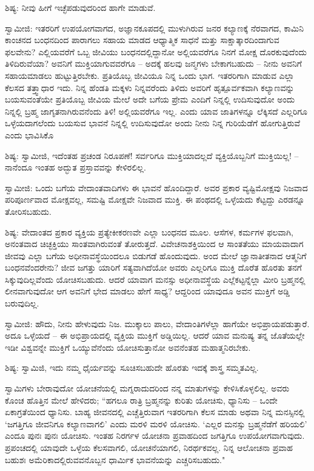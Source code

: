 ಶಿಷ್ಯ: ನೀವು ಹೀಗೆ ಇಚ್ಛೆಪಡುವುದರಿಂದ ಹಾಗೇ ಮಾಡುವೆ.

ಸ್ವಾಮೀಜಿ: ಇತರರಿಗೆ ಉಪಯೋಗವಾಗದ, ಅಜ್ಞಾನಕೂಪದಲ್ಲಿ ಮುಳುಗಿರುವ ಜನರ ಕಲ್ಯಾಣಕ್ಕೆ ನೆರವಾಗದ, ಕಾಮಿನಿ ಕಾಂಚನದ ಬಂಧನದಿಂದ ಪಾರಾಗಲು ಸಹಾಯ ಮಾಡದ ಆಧ್ಯಾತ್ಮಿಕ ಸಾಧನೆ ಮತ್ತು ಸಾಕ್ಷಾತ್ಕಾರದಿಂದಾಗುವ ಫಲವೇನು? ಎಲ್ಲಿಯವರೆಗೆ ಒಬ್ಬ ಜೀವಿಯು ಬಂಧನದಲ್ಲಿದ್ದಾನೋ ಅಲ್ಲಿಯವರೆಗೂ ನಿನಗೆ ಮೋಕ್ಷ ದೊರಕುವುದೆಂದು ತಿಳಿದಿರುವೆಯಾ? ಅವನಿಗೆ ಮುಕ್ತಿಯಾಗುವವರೆಗೂ – ಅದಕ್ಕೆ ಹಲವು ಜನ್ಮಗಳು ಬೇಕಾಗಬಹುದು – ನೀನು ಅವನಿಗೆ ಸಹಾಯಮಾಡಲು ಹುಟ್ಟುತ್ತಿರಬೇಕು. ಪ್ರತಿಯೊಬ್ಬ ಜೀವಿಯೂ ನಿನ್ನ ಒಂದು ಭಾಗ. ಇತರರಿಗಾಗಿ ಮಾಡುವ ಎಲ್ಲಾ ಕೆಲಸದ ತತ್ತ್ವಾಧಾರ ಇದು. ನಿನ್ನ ಹೆಂಡತಿ ಮಕ್ಕಳು ನಿನ್ನವರೆಂದು ತಿಳಿದು ಅವರಿಗೆ ಹೃತ್ಪೂರ್ವಕವಾಗಿ ಕಲ್ಯಾಣವನ್ನು ಬಯಸುವಂತೆಯೇ ಪ್ರತಿಯೊಬ್ಬ ಜೀವಿಯ ಮೇಲೆ ಅದೇ ಬಗೆಯ ಪ್ರೇಮ ಎಂದಿಗೆ ನಿನ್ನಲ್ಲಿ ಉದಿಸುವುದೋ ಅಂದು ನಿನ್ನಲ್ಲಿ ಬ್ರಹ್ಮ ಜಾಗೃತನಾಗಿರುವನೆಂದು ತಿಳಿ! ಅಲ್ಲಿಯವರೆಗೂ ಇಲ್ಲ. ಎಂದು ಯಾವ ಜಾತಿಗಳನ್ನೂ ಲೆಕ್ಕಿಸದೆ ಎಲ್ಲರಿಗೂ ಒಳ್ಳೆಯದಾಗಲೆಂದು ಬಯಸುವ ಭಾವನೆ ನಿನ್ನಲ್ಲಿ ಉದಿಸುವುದೋ ಅಂದು ನೀನು ನಿನ್ನ ಗುರಿಯೆಡೆಗೆ ಹೋಗುತ್ತಿರುವೆ ಎಂದು ಭಾವಿಸಿಕೊ

ಶಿಷ್ಯ: ಸ್ವಾಮೀಜಿ, ಇದೆಂತಹ ಪ್ರಚಂಡ ನಿರೂಪಣೆ! ಸರ್ವರಿಗೂ ಮುಕ್ತಿಯಾದಲ್ಲದೆ ವ್ಯಕ್ತಿಯೊಬ್ಬನಿಗೆ ಮುಕ್ತಿಯಿಲ್ಲ! – ನಾನೆಂದೂ ಇಂತಹ ಅದ್ಭುತ ಪ್ರಸ್ತಾವವನ್ನು ಕೇಳಿರಲಿಲ್ಲ.

ಸ್ವಾಮೀಜಿ: ಒಂದು ಬಗೆಯ ವೇದಾಂತವಾದಿಗಳು ಈ ಭಾವನೆ ಹೊಂದಿದ್ದಾರೆ. ಅವರ ಪ್ರಕಾರ ವ್ಯಷ್ಟಿಮೋಕ್ಷವು ನಿಜವಾದ ಪರಿಪೂರ್ಣವಾದ ಮೋಕ್ಷವಲ್ಲ, ಸಮಷ್ಟಿ ಮೋಕ್ಷವೇ ನಿಜವಾದ ಮುಕ್ತಿ. ಈ ಪಂಥದಲ್ಲಿ ಒಳ್ಳೆಯದು ಕೆಟ್ಟದ್ದು ಎರಡನ್ನೂ ತೋರಿಸಬಹುದು.

ಶಿಷ್ಯ: ವೇದಾಂತದ ಪ್ರಕಾರ ವ್ಯಕ್ತಿಯ ಪ್ರತ್ಯೇಕೀಕರಣವೇ ಎಲ್ಲಾ ಬಂಧನದ ಮೂಲ. ಆಸೆಗಳ, ಕರ್ಮಗಳ ಫಲವಾಗಿ, ಅನಂತವಾದ ಚಿಚ್ಛಕ್ತಿಯು ಸಾಂತವಾಗಿರುವಂತೆ ತೋರುತ್ತದೆ. ವಿವೇಚನಾಶಕ್ತಿಯಿಂದ ಆ ಸಾಂತತೆಯು ಮಾಯವಾದಾಗ ಜೀವವು ಎಲ್ಲಾ ಬಗೆಯ ಅಧೀನಾವಸ್ಥೆಯಿಂದಲೂ ಬಿಡುಗಡೆ ಹೊಂದುವುದು. ಅಂದ ಮೇಲೆ ಜ್ಞಾನಾತೀತನಾದ ಆತ್ಮನಿಗೆ ಬಂಧನವೆಂದರೇನು? ಜೀವ ಜಗತ್ತು ಯಾರಿಗೆ ಸತ್ಯವಾಗಿದೆಯೋ ಅವರು ಎಲ್ಲರಿಗೂ ಮುಕ್ತಿ ದೊರೆತ ಹೊರತು ತನಗೆ ಸಿಕ್ಕುವುದಿಲ್ಲವೆಂದು ಯೋಚಿಸಬಹುದು. ಆದರೆ ಯಾವಾಗ ಮನಸ್ಸು ಅಧೀನಾವಸ್ಥೆಯ ಎಲ್ಲೆಕಟ್ಟನ್ನೆಲ್ಲಾ ಮೀರಿ ಬ್ರಹ್ಮನಲ್ಲಿ ಲೀನವಾಗುವುದೋ ಆಗ ಅವನಿಗೆ ಭೇದ ಮಾಡಲು ಹೇಗೆ ಸಾಧ್ಯ? ಆದ್ದರಿಂದ ಯಾವುದೂ ಅವನ ಮುಕ್ತಿಗೆ ಅಡ್ಡಿ ಬರುವುದಿಲ್ಲ.

ಸ್ವಾಮೀಜಿ: ಹೌದು, ನೀನು ಹೇಳುವುದು ನಿಜ. ಮುಕ್ಕಾಲು ಪಾಲು, ವೇದಾಂತಿಗಳೆಲ್ಲಾ ಹಾಗೆಯೇ ಅಭಿಪ್ರಾಯಪಡುತ್ತಾರೆ. ಅದೂ ಒಳ್ಳೆಯದೆ – ಈ ಅಭಿಪ್ರಾಯದಲ್ಲಿ ವ್ಯಕ್ತಿಯ ಮುಕ್ತಿಗೆ ಅಡ್ಡಿಯಿಲ್ಲ. ಆದರೆ ಯಾವ ಮನುಷ್ಯ ತನ್ನ ಜೊತೆಯಲ್ಲೇ ಇಡೀ ವಿಶ್ವವನ್ನೇ ಮುಕ್ತಿಗೆ ಒಯ್ಯುವೆನೆಂದು ಯೋಚಿಸುತ್ತಾನೋ ಅವನೆಂತಹ ಮಹಾತ್ಮನಿರಬೇಕು.

ಶಿಷ್ಯ: ಸ್ವಾಮಿಜಿ, ಇದು ನಮ್ಮ ಧೈರ್ಯವನ್ನು ಸೂಚಿಸಬಹುದೇ ಹೊರತು ಇದಕ್ಕೆ ಶಾಸ್ತ್ರ ಸಮ್ಮತವಿಲ್ಲ.

ಸ್ವಾಮಿಗಳು ಬೇರಾವುದೋ ಯೋಚನೆಯಲ್ಲಿ ಮಗ್ನರಾದುದರಿಂದ ನನ್ನ ಮಾತುಗಳನ್ನು ಕೇಳಿಸಿಕೊಳ್ಳಲಿಲ್ಲ. ಅವರು ಕೊಂಚ ಹೊತ್ತಿನ ಮೇಲೆ ಹೇಳಿದರು; “ಹಗಲೂ ರಾತ್ರಿ ಬ್ರಹ್ಮನನ್ನು ಕುರಿತು ಯೋಚಿಸು, ಧ್ಯಾನಿಸು – ಒಂದೇ ಏಕಾಗ್ರತೆಯಿಂದ ಧ್ಯಾನಿಸು. ಬಾಹ್ಯ ಜೀವನದಲ್ಲಿ ಎಚ್ಚೆತ್ತಿರುವಾಗ ಇತರರಿಗಾಗಿ ಕೆಲಸ ಮಾಡು ಅಥವಾ ನಿನ್ನ ಮನಸ್ಸಿನಲ್ಲಿ ‘ಜಗತ್ತಿಗೂ ಜೀವನಿಗೂ ಕಲ್ಯಾಣವಾಗಲಿ’ ಎಂದು ಮರಳಿ ಮರಳಿ ಯೋಚಿಸು. ‘ಎಲ್ಲರ ಮನಸ್ಸು ಬ್ರಹ್ಮನೆಡೆಗೆ ಹರಿಯಲಿ’ ಎಂದೂ ಪುನಃ ಪುನಃ ಯೋಚಿಸು. ಇಂತಹ ನಿರರ್ಗಳ ಯೋಚನಾ ಪ್ರವಾಹದಿಂದ ಜಗತ್ತಿಗೂ ಉಪಯೋಗವಾಗುವುದು. ಪ್ರಪಂಚದಲ್ಲಿ ಯಾವುದೇ ಒಳ್ಳೆಯ ಕೆಲಸವಾಗಲಿ, ಯೋಚನೆಯಾಗಲಿ, ನಿರರ್ಥಕವಲ್ಲ. ನಿನ್ನ ಆಲೋಚನಾ ಪ್ರವಾಹ ಬಹುಶಃ ಅಮೆರಿಕಾದಲ್ಲಿರುವವನೊಬ್ಬನ ಧಾರ್ಮಿಕ ಭಾವನೆಯನ್ನು ಎಚ್ಚರಿಸಬಹುದು."

